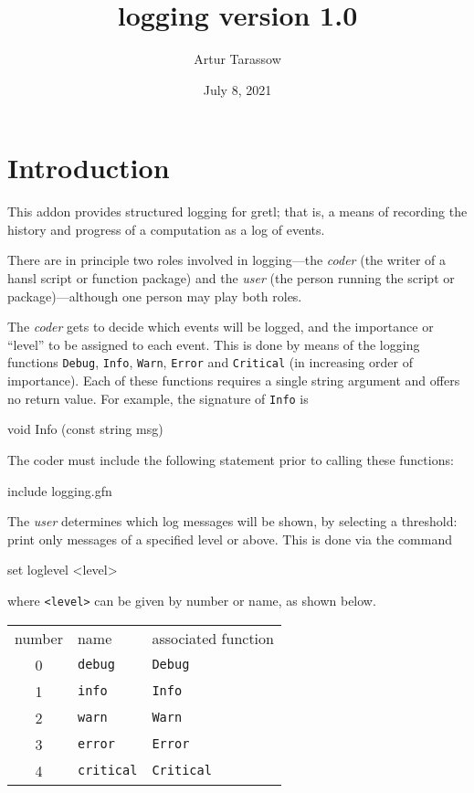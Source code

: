 \documentclass{article}
\begin{document}
\setlength{\parindent}{0pt}
\setlength{\parskip}{1ex}

\newcommand{\argname}[1]{\textsl{#1}}

\title{logging version 1.0}
\author{Artur Tarassow}
\date{July 8, 2021}
\maketitle

\section{Introduction}

This addon provides structured logging for gretl; that is, a means of
recording the history and progress of a computation as a log of
events.

There are in principle two roles involved in logging---the
\textit{coder} (the writer of a hansl script or function package) and
the \textit{user} (the person running the script or
package)---although one person may play both roles.

The \textit{coder} gets to decide which events will be logged, and the
importance or ``level'' to be assigned to each event. This is done by
means of the logging functions \texttt{Debug}, \texttt{Info},
\texttt{Warn}, \texttt{Error} and \texttt{Critical} (in increasing
order of importance).  Each of these functions requires a single
string argument and offers no return value. For example, the signature
of \texttt{Info} is
\begin{code}
void Info (const string msg)
\end{code}
The coder must include the following statement prior to calling these
functions:
\begin{code}
include logging.gfn
\end{code}

The \textit{user} determines which log messages will be shown, by
selecting a threshold: print only messages of a specified level or
above.  This is done via the command
\begin{code}
set loglevel <level>
\end{code}
where \verb|<level>| can be given by number or name, as shown below.

\begin{center}
  \begin{tabular}{cll}
    number & name & associated function \\[4pt]
    0 & \texttt{debug} & \texttt{Debug}\\
    1 & \texttt{info} & \texttt{Info}\\
    2 & \texttt{warn} & \texttt{Warn}\\
    3 & \texttt{error} & \texttt{Error}\\
    4 & \texttt{critical} & \texttt{Critical}
  \end{tabular}
\end{center}
\end{document}
